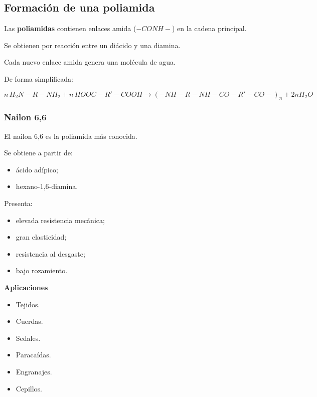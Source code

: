\subsection{Formación de una poliamida}

Las \textbf{poliamidas} contienen enlaces amida
(\(-CONH-\)) en la cadena principal.

Se obtienen por reacción entre un diácido y una diamina.

Cada nuevo enlace amida genera una molécula de agua.

De forma simplificada:

\[
n\,H_2N-R-NH_2
+
n\,HOOC-R'-COOH
\longrightarrow
(-NH-R-NH-CO-R'-CO-)_n
+
2nH_2O
\]


\subsubsection*{Nailon 6,6}

El nailon 6,6 es la poliamida más conocida.

Se obtiene a partir de:

\begin{itemize}

\item ácido adípico;

\item hexano-1,6-diamina.

\end{itemize}

Presenta:

\begin{itemize}

\item elevada resistencia mecánica;

\item gran elasticidad;

\item resistencia al desgaste;

\item bajo rozamiento.

\end{itemize}

\textbf{Aplicaciones}

\begin{itemize}

\item Tejidos.

\item Cuerdas.

\item Sedales.

\item Paracaídas.

\item Engranajes.

\item Cepillos.

\end{itemize}


